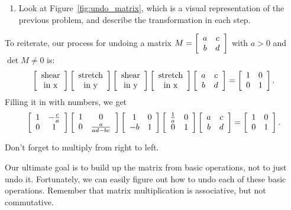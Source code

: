 \documentclass[../gatm.tex]{subfiles}
\begin{document}
\begin{enumerate}
\item Look at Figure~\ref{fig:undo_matrix}, which is a visual representation of the previous problem, and describe the transformation in each step.
\end{enumerate}

To reiterate, our process for undoing a matrix $M=\left[\begin{array}{cc} a & c \\ b & d \end{array}\right]$ with $a>0$ and $\det M\neq 0$ is:
$$\left[\begin{array}{c}\text{shear} \\ \text{in x}\end{array}\right]
\left[\begin{array}{c}\text{stretch} \\ \text{in y}\end{array}\right]
\left[\begin{array}{c}\text{shear} \\ \text{in y}\end{array}\right]
\left[\begin{array}{c}\text{stretch} \\ \text{in x}\end{array}\right]
\left[\begin{array}{cc} a & c \\ b & d \end{array}\right]=\left[\begin{array}{cc} 1 & 0 \\ 0 & 1 \end{array}\right].$$
Filling it in with numbers, we get
$$\left[\begin{array}{cc} 1 & -\frac{c}{a} \\ 0 & 1 \end{array}\right]\left[\begin{array}{cc} 1 & 0 \\ 0 & \frac{a}{ad-bc} \end{array}\right]\left[\begin{array}{cc} 1 & 0 \\ -b & 1 \end{array}\right]\left[\begin{array}{cc} \frac{1}{a} & 0 \\ 0 & 1 \end{array}\right]\left[\begin{array}{cc} a & c \\ b & d \end{array}\right]=\left[\begin{array}{cc} 1 & 0 \\ 0 & 1 \end{array}\right].$$

Don't forget to multiply from right to left.

Our ultimate goal is to build up the matrix from basic operations, not to just undo it. Fortunately, we can easily figure out how to undo each of these basic operations. Remember that matrix multiplication is associative, but not commutative.
\vspace{10ex}
\end{document}
